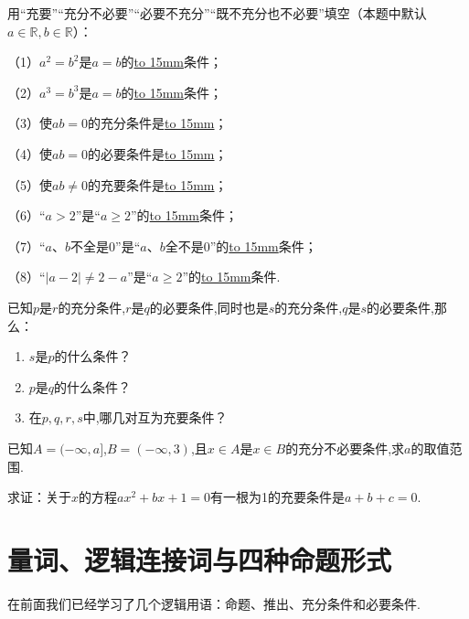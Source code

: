\documentclass[lang=cn,math=cm,chinesefont=nofont,11pt,scheme=chinese,twocol]{elegantbook}
\begin{document}
\begin{exercise}\label{BJ4Z_Algebra1_P28.2}
  用“充要”“充分不必要”“必要不充分”“既不充分也不必要”填空（本题中默认$a\in\mathbb{R},b\in\mathbb{R}$）：

  （1）$a^2=b^2$是$a=b$的\underline{\hbox to 15mm{}}条件；

  （2）$a^3=b^3$是$a=b$的\underline{\hbox to 15mm{}}条件；

  （3）使$ab=0$的充分条件是\underline{\hbox to 15mm{}}；

  （4）使$ab=0$的必要条件是\underline{\hbox to 15mm{}}；

  （5）使$ab\neq 0$的充要条件是\underline{\hbox to 15mm{}}；

  （6）“$a>2$”是“$a\geqslant2$”的\underline{\hbox to 15mm{}}条件；

  （7）“$a、b$不全是0”是“$a、b$全不是0”的\underline{\hbox to 15mm{}}条件；

  （8）“$\vert a-2\vert\neq2-a$”是“$a\geqslant2$”的\underline{\hbox to 15mm{}}条件.
\end{exercise}

\begin{exercise}\label{2017_XJ_bx1_P23.8}
  已知$p$是$r$的充分条件,$r$是$q$的必要条件,同时也是$s$的充分条件,$q$是$s$的必要条件,那么：
\end{exercise}

\begin{enumerate}
  \item $s$是$p$的什么条件？
  \item $p$是$q$的什么条件？
  \item 在$p,q,r,s$中,哪几对互为充要条件？
\end{enumerate}

\begin{exercise}\label{2017_RJB_bx1_P36.B5}
  已知$A=(-\infty,a]$,$B=(-\infty,3)$,且$x\in A$是$x\in B$的充分不必要条件,求$a$的取值范围.
\end{exercise}

\begin{exercise}\label{zhw2000_g1_P51.78}
  求证：关于$x$的方程$ax^2+bx+1=0$有一根为1的充要条件是$a+b+c=0$.
\end{exercise}

\section{量词、逻辑连接词与四种命题形式}

在前面我们已经学习了几个逻辑用语：命题、推出、充分条件和必要条件.
\end{document}
